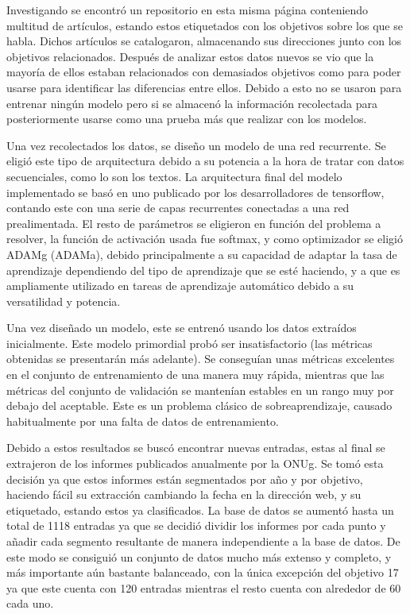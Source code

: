 Investigando se encontró un repositorio en esta misma página \cite{JointSDGFund}
conteniendo multitud de artículos, estando estos etiquetados con los objetivos
sobre los que se habla. Dichos artículos se catalogaron, almacenando sus
direcciones junto con los objetivos relacionados. Después de analizar estos
datos nuevos se vio que la mayoría de ellos estaban relacionados con demasiados
objetivos como para poder usarse para identificar las diferencias entre ellos.
Debido a esto no se usaron para entrenar ningún modelo pero si se almacenó la
información recolectada para posteriormente usarse como una prueba más que
realizar con los modelos. 

Una vez recolectados los datos, se diseño un modelo de una red recurrente. Se
eligió este tipo de arquitectura debido a su potencia a la hora de tratar con
datos secuenciales, como lo son los textos. La arquitectura final del modelo
implementado se basó en uno publicado por los desarrolladores de tensorflow,
contando este con una serie de capas recurrentes conectadas a una red prealimentada. El resto de
parámetros se eligieron en función del problema a resolver, la función de
activación usada fue softmax, y como optimizador se eligió \gls{ADAMg} (\gls{ADAMa}), debido principalmente a su capacidad de adaptar la tasa de aprendizaje dependiendo del tipo de aprendizaje que se esté haciendo, y a que es ampliamente utilizado en tareas de aprendizaje automático debido a su versatilidad y potencia.

Una vez diseñado un modelo, este se entrenó usando los datos extraídos
inicialmente. Este modelo primordial probó ser insatisfactorio (las métricas
obtenidas se presentarán más adelante). Se conseguían unas métricas excelentes
en el conjunto de entrenamiento de una manera muy rápida, mientras que las
métricas del conjunto de validación se mantenían estables en un rango muy por
debajo del aceptable. Este es un problema clásico de sobreaprendizaje, causado
habitualmente por una falta de datos de entrenamiento. 

Debido a estos resultados se buscó encontrar nuevas entradas, estas al final se
extrajeron de los informes publicados anualmente por la \gls{ONUg}. Se tomó
esta decisión ya que estos informes están segmentados por año y por objetivo,
haciendo fácil su extracción cambiando la fecha en la dirección web, y su
etiquetado, estando estos ya clasificados. La base de datos se aumentó hasta un
total de 1118 entradas ya que se decidió dividir los informes por cada punto y
añadir cada segmento resultante de manera independiente a la base de datos. De
este modo se consiguió un conjunto de datos mucho más extenso y completo, y más
importante aún bastante balanceado, con la única excepción del objetivo 17 ya
que este cuenta con 120 entradas mientras el resto cuenta con alrededor de 60
cada uno. 


